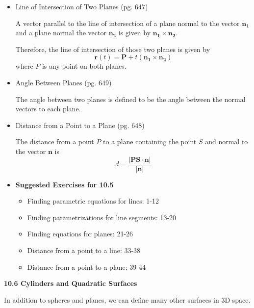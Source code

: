 \documentclass[12pt]{article}
\theoremstyle{plain}
\theoremstyle{definition}
\theoremstyle{remark}
\newcommand{\vect}[1]{\mathbf{#1}}
\begin{document}
\begin{itemize}
		\item Line of Intersection of Two Planes (pg. 647)
		
		A vector parallel to the line of intersection of a plane normal to the vector $\vect{n_1}$ and a plane normal the vector $\vect{n_2}$ is given by $\vect{n_1} \times \vect{n_2}$. 
		
		Therefore, the line of intersection of those two planes is given by \[\vect{r}(t) = \vect{P} + t(\vect{n_1} \times \vect{n_2})\] where $P$ is any point on both planes.
		
		\item Angle Between Planes (pg. 649)
		
		The angle between two planes is defined to be the angle between the normal vectors to each plane.
		
		\item Distance from a Point to a Plane (pg. 648)
		
		The distance from a point $P$ to a plane containing the point $S$ and normal to the vector $\vect{n}$ is \[d = \frac{|\vect{PS} \cdot \vect{n}|}{|\vect{n}|}\]
\newpage
		\item \textbf{Suggested Exercises for 10.5}
			\begin{itemize}
			\item Finding parametric equations for lines: 1-12
			\item Finding parametrizations for line segments: 13-20
			\item Finding equations for planes: 21-26
			\item Distance from a point to a line: 33-38
			\item Distance from a point to a plane: 39-44
			\end{itemize}
		
		\end{itemize}


\newpage

\centerline{\bf 10.6 Cylinders and Quadratic Surfaces }

In addition to spheres and planes, we can define many other surfaces in 3D space.
\end{document}
